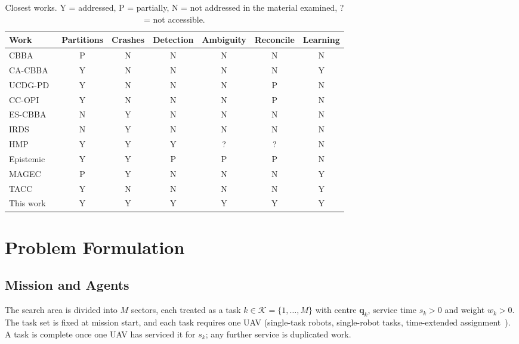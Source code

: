 \documentclass[journal]{IEEEtran}
\begin{document}
\begin{table}[!t]
\centering
\caption{Closest works. Y = addressed, P = partially, N = not addressed in the material examined, ? = not accessible.}
\label{tab:related}
\footnotesize
\begin{tabular}{@{}lcccccc@{}}
\toprule
Work & Partitions & Crashes & Detection & Ambiguity & Reconcile & Learning\\
\midrule
CBBA~\cite{R02_choi2009} & P & N & N & N & N & N\\
CA-CBBA~\cite{R22_raja2022} & Y & N & N & N & N & Y\\
UCDG-PD~\cite{R25_qian2026} & Y & N & N & N & P & N\\
CC-OPI~\cite{R66_liu2026} & Y & N & N & N & P & N\\
ES-CBBA~\cite{R35_bai2026} & N & Y & N & N & N & N\\
IRDS~\cite{R67_giacomossi2026} & N & Y & N & N & N & N\\
HMP~\cite{R41_santhirasegaram2026} & Y & Y & Y & ? & ? & N\\
Epistemic~\cite{R34_bramblett2023} & Y & Y & P & P & P & N\\
MAGEC~\cite{R53_goeckner2024} & P & Y & N & N & N & Y\\
TACC~\cite{R50_xiong2026} & Y & N & N & N & N & Y\\
\midrule
This work & Y & Y & Y & Y & Y & Y\\
\bottomrule
\end{tabular}
\end{table}

\section{Problem Formulation}\label{sec:problem}

\subsection{Mission and Agents}
The search area is divided into $M$ sectors, each treated as a task $k\in\mathcal{K}=\{1,\dots,M\}$ with centre $\mathbf{q}_k$, service time $s_k>0$ and weight $w_k>0$. The task set is fixed at mission start, and each task requires one UAV (single-task robots, single-robot tasks, time-extended assignment~\cite{R01_gerkey2004}). A task is complete once one UAV has serviced it for $s_k$; any further service is duplicated work.
\end{document}
